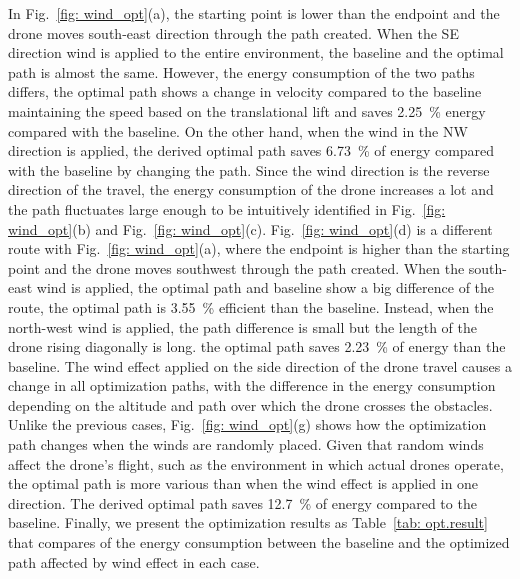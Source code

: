 \documentclass[journal]{./template/IEEEtran}
\begin{document}
In Fig.~\ref{fig: wind_opt}(a), the starting point is lower than the endpoint and the drone moves south-east direction through the path created. 
When the SE direction wind is applied to the entire environment, the baseline and the optimal path is almost the same.
However, the energy consumption of the two paths differs, the optimal path shows a change in velocity compared to the baseline maintaining the speed based on the translational lift and saves 2.25~\% energy compared with the baseline.
On the other hand, when the wind in the NW direction is applied, the derived optimal path saves 6.73~\% of energy compared with the baseline by changing the path.
Since the wind direction is the reverse direction of the travel, the energy consumption of the drone increases a lot and the path fluctuates large enough to be intuitively identified in Fig.~\ref{fig: wind_opt}(b) and Fig.~\ref{fig: wind_opt}(c).  
Fig.~\ref{fig: wind_opt}(d) is a different route with Fig.~\ref{fig: wind_opt}(a), where the endpoint is higher than the starting point and the drone moves southwest through the path created. When the south-east wind is applied, the optimal path and baseline show a big difference of the route, the optimal path is 3.55~\% efficient than the baseline.
Instead, when the north-west wind is applied, the path difference is small but the length of the drone rising diagonally is long. the optimal path saves 2.23~\% of energy than the baseline.
The wind effect applied on the side direction of the drone travel causes a change in all optimization paths, with the difference in the energy consumption depending on the altitude and path over which the drone crosses the obstacles.
Unlike the previous cases, Fig.~\ref{fig: wind_opt}(g) shows how the optimization path changes when the winds are randomly placed.
Given that random winds affect the drone's flight, such as the environment in which actual drones operate, the optimal path is more various than when the wind effect is applied in one direction.
The derived optimal path saves 12.7~\% of energy compared to the baseline. 
Finally, we present the optimization results as Table~\ref{tab: opt.result} that compares of the energy consumption between the baseline and the optimized path affected by wind effect in each case.
\end{document}

